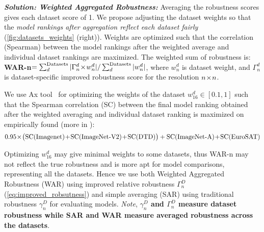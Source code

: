 \textbf{\textit{Solution: Weighted Aggregated Robustness:}}
Averaging the robustness scores gives each dataset score of 1. 
We propose adjusting the dataset weights so that the \textit{model rankings after aggregation reflect each dataset fairly} (\cref{fig:datasets_weights} (right)). 
Weights are optimized such that the correlation (Spearman) between the model rankings after the weighted average and individual dataset rankings are maximized. 
The weighted sum of robustness is:
\textbf{WAR-n}$=\sum_d^{\text{Datasets}} | \Gamma^{d}_{n} \!\times\! w^d_n |  / \sum_d^{\text{Datasets}} | w^d_n |$, where $w^d_n$ is dataset weight, and $\Gamma^{d}_{n}$ is dataset-specific improved robustness score for the resolution $n\!\times\! n$.

We use Ax tool~\citep{bakshy2018} for optimizing the weights of the dataset $w^d_{16}\!\in\![0.1,1]$ such that the Spearman correlation (SC) between the final model ranking obtained after the weighted averaging and individual dataset ranking is maximized on  
empirically found (more in \Supp):
\vspace{-0.4cm}
\begin{align}
0.95\x
\big(\MTEXT{SC(Imagenet)}\!+\!\MTEXT{SC(ImageNet-V2)}\!+\! \MTEXT{SC(DTD)}\big) + \MTEXT{SC(ImageNet-A)}\!+\!\MTEXT{SC(EuroSAT)}
\end{align} \vspace{-0.65cm}

Optimizing $w^d_{16}$ may give minimal weights to some datasets, thus WAR-n may not reflect the true robustness and is more apt for model comparisons, representing all the datasets.  
Hence we use both Weighted Aggregated Robustness (WAR) using improved relative robustness $\Gamma^{D}_{n}$ (\cref{eq:improved_robsutness}) and simple averaging (SAR) using traditional robustness $\gamma^{D}_{n}$ for evaluating models. 
\textit{Note}, \textbf{$\gamma^{D}_{n}$ and $\Gamma^{D}_{n}$ measure dataset robustness while SAR and WAR measure averaged robustness across the datasets}. 

 












 
 


   



